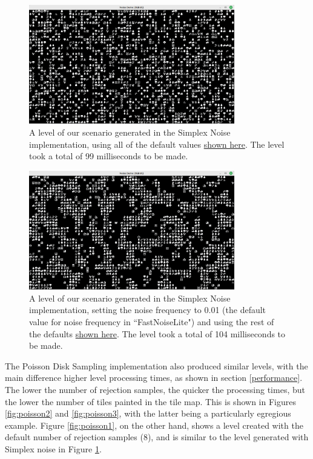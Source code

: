 \begin{figure}[H]
    \centering
    \includegraphics[width=0.8\textwidth]{Images/simplex_smooth_default_1.png}
    \caption{A level of our scenario generated in the Simplex Noise implementation, using all of the default values \hyperref[noisedefaults]{shown here}. The level took a total of 99 milliseconds to be made.}
    \label{fig:simplexsmoothdefault1}
\end{figure}

\begin{figure}[H]
    \centering
    \includegraphics[width=0.8\textwidth]{Images/simplex_smooth_0.01_frequency.png}
    \caption{A level of our scenario generated in the Simplex Noise implementation, setting the noise frequency to 0.01 (the default value for noise frequency in ``FastNoiseLite") and using the rest of the defaults \hyperref[noisedefaults]{shown here}. The level took a total of 104 milliseconds to be made.}
    \label{fig:simplexsmooth0.01}
\end{figure}

The Poisson Disk Sampling implementation also produced similar levels, with the main difference higher level processing times, as shown in section \ref{performance}. The lower the number of rejection samples, the quicker the processing times, but the lower the number of tiles painted in the tile map. This is shown in Figures \ref{fig:poisson2} and \ref{fig:poisson3}, with the latter being a particularly egregious example. Figure \ref{fig:poisson1}, on the other hand, shows a level created with the default number of rejection samples (8), and is similar to the level generated with Simplex noise in Figure \ref{fig:simplexsmoothdefault1}.

